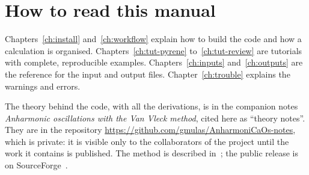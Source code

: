 \section{How to read this manual}

Chapters~\ref{ch:install} and~\ref{ch:workflow} explain how to build the
code and how a calculation is organised. Chapters~\ref{ch:tut-pyrene}
to~\ref{ch:tut-review} are tutorials with complete, reproducible
examples. Chapters~\ref{ch:inputs} and~\ref{ch:outputs} are the
reference for the input and output files. Chapter~\ref{ch:trouble}
explains the warnings and errors.

The theory behind the code, with all the derivations, is in the companion
notes \emph{Anharmonic oscillations with the Van Vleck method}, cited here
as ``theory notes''. They are in the repository
\url{https://github.com/gmulas/AnharmoniCaOs-notes}, which is private: it
is visible only to the collaborators of the project until the work it
contains is published. The method is described in~\cite{mulas2018}; the
public release is on SourceForge~\cite{anharmonicasf}.
